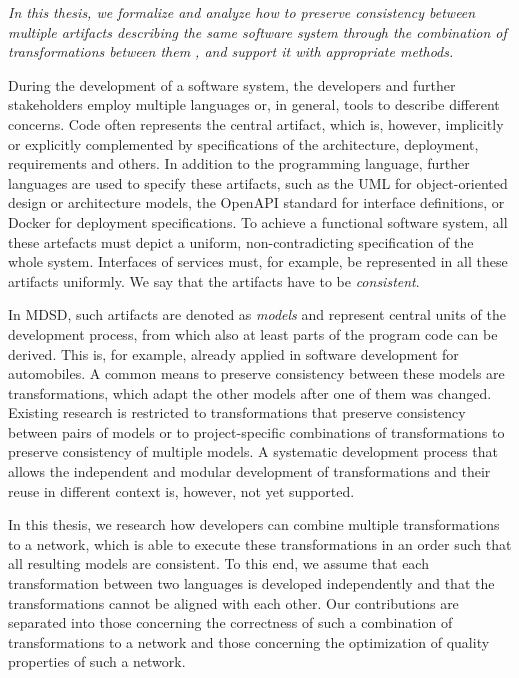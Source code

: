 \emph{In this thesis, we formalize and analyze how to preserve consistency between multiple artifacts describing the same software system through the combination of transformations between them%
, and support it with appropriate methods.}

During the development of a software system, the developers and further stakeholders employ multiple languages or, in general, tools to describe different concerns.
Code often represents the central artifact, which is, however, implicitly or explicitly complemented by specifications of the architecture, deployment, requirements and others.
In addition to the programming language, further languages are used to specify these artifacts, such as the \acrshort{UML} for object-oriented design or architecture models, the OpenAPI standard for interface definitions, or Docker for deployment specifications.
To achieve a functional software system, all these artefacts must depict a uniform, non-contradicting specification of the whole system.
Interfaces of services must, for example, be represented in all these artifacts uniformly.
We say that the artifacts have to be \emph{consistent}.

In \acrlong{MDSD}, such artifacts are denoted as \emph{models} and represent central units of the development process, from which also at least parts of the program code can be derived.
This is, for example, already applied in software development for automobiles.
A common means to preserve consistency between these models are transformations, which adapt the other models after one of them was changed.
Existing research is restricted to transformations that preserve consistency between pairs of models or to project-specific combinations of transformations to preserve consistency of multiple models.
A systematic development process that allows the independent and modular development of transformations and their reuse in different context is, however, not yet supported.

In this thesis, we research how developers can combine multiple transformations to a network, which is able to execute these transformations in an order such that all resulting models are consistent.
To this end, we assume that each transformation between two languages is developed independently and that the transformations cannot be aligned with each other.
Our contributions are separated into those concerning the correctness of such a combination of transformations to a network and those concerning the optimization of quality properties of such a network.

